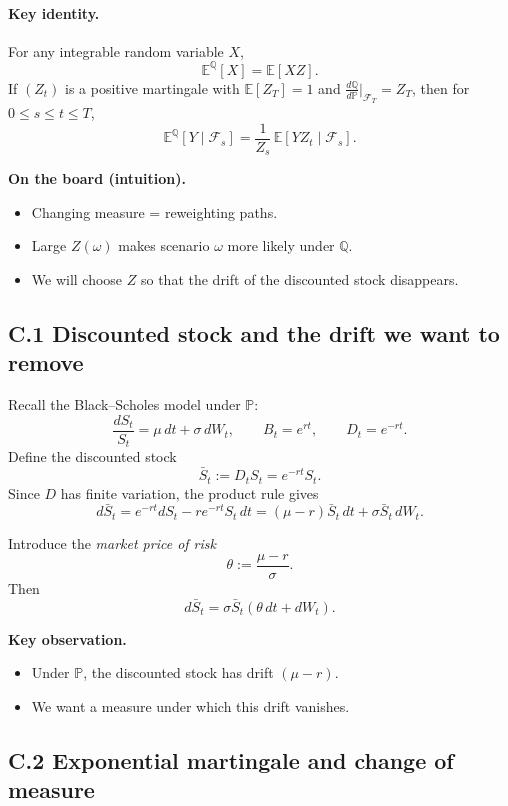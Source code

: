\documentclass[11pt]{article}
\theoremstyle{definition}
\theoremstyle{remark}
\newcommand{\Pbb}{\mathbb{P}}
\newcommand{\Qbb}{\mathbb{Q}}
\newcommand{\E}{\mathbb{E}}
\newcommand{\1}{\mathbf{1}}
\theoremstyle{definition}
\begin{document}
\paragraph{Key identity.}
For any integrable random variable $X$,
\[
\E^{\Qbb}[X]=\E[XZ].
\]
If $(Z_t)$ is a positive martingale with $\E[Z_T]=1$ and
$\frac{d\Qbb}{d\Pbb}\big|_{\mathcal F_T}=Z_T$, then for $0\le s\le t\le T$,
\[
\E^{\Qbb}[Y\mid\mathcal F_s]
=
\frac{1}{Z_s}\,\E[YZ_t\mid\mathcal F_s].
\]


\textbf{On the board (intuition).}
\begin{itemize}
\item Changing measure = reweighting paths.
\item Large $Z(\omega)$ makes scenario $\omega$ more likely under $\Qbb$.
\item We will choose $Z$ so that the drift of the discounted stock disappears.
\end{itemize}


\subsection*{C.1 Discounted stock and the drift we want to remove}

Recall the Black--Scholes model under $\Pbb$:
\[
\frac{dS_t}{S_t}=\mu\,dt+\sigma\,dW_t,
\qquad
B_t=e^{rt},
\qquad
D_t=e^{-rt}.
\]
Define the discounted stock
\[
\bar S_t := D_t S_t = e^{-rt}S_t.
\]
Since $D$ has finite variation, the product rule gives
\[
d\bar S_t
=
e^{-rt}dS_t - r e^{-rt}S_t\,dt
=
(\mu-r)\bar S_t\,dt + \sigma \bar S_t\,dW_t.
\]

Introduce the \emph{market price of risk}
\[
\theta:=\frac{\mu-r}{\sigma}.
\]
Then
\[
d\bar S_t=\sigma \bar S_t(\theta\,dt+dW_t).
\]


\textbf{Key observation.}
\begin{itemize}
\item Under $\Pbb$, the discounted stock has drift $(\mu-r)$.
\item We want a measure under which this drift vanishes.
\end{itemize}


\subsection*{C.2 Exponential martingale and change of measure}
\end{document}
